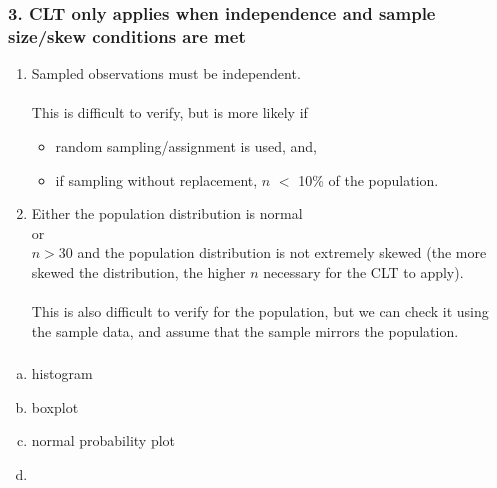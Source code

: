 \documentclass[slidestop,compress,mathserif,12pt,t,professionalfonts,xcolor=table]{beamer}
\newcommand{\solnMult}[1]{
\only<1>{#1}
\only<2->{\red{\textbf{#1}}}
}
\begin{document}
\begin{frame}
\frametitle{3. CLT only applies when independence and sample size/skew conditions are met}

\begin{enumerate}

\item {} Sampled observations must be independent. \\

$\:$ \\
This is difficult to verify, but is more likely if
\begin{itemize}
\item random sampling/assignment is used, and,
\item if sampling without replacement, $n$ $<$ 10\% of the population.
\end{itemize}

\pause

\item {} Either the population distribution is normal \\
or\\
$n > 30$ and the population distribution is not extremely skewed (the more skewed the distribution, the higher $n$ necessary for the CLT to apply).\\
$\:$ \\
This is also difficult to verify for the population, but we can check it using the sample data, and assume that the sample mirrors the population.

\end{enumerate}


\end{frame}


\begin{frame}
\frametitle{}


\begin{enumerate}[(a)]
\item histogram
\item boxplot
\item normal probability plot
\item \solnMult{mosaicplot}
\end{enumerate}


\end{frame}
\end{document}
